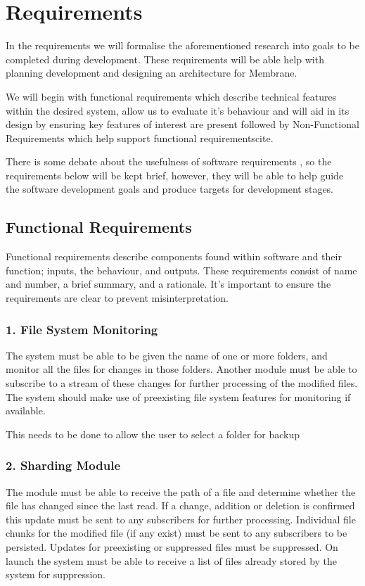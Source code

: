\documentclass[11pt, a4paper, twocolumn, twoside]{report}
\begin{document}
\section{Requirements}

In the requirements we will formalise the aforementioned research into goals to be completed during development. These requirements will be able help with planning development and designing an architecture for Membrane.

We will begin with functional requirements which describe technical features within the desired system, allow us to evaluate it's behaviour and will aid in its design by ensuring key features of interest are present  followed by Non-Functional Requirements which help support functional requirements{cite}.

There is some debate about the usefulness of software requirements , so the requirements below will be kept brief, however, they will be able to help guide the software development goals and produce targets for development stages.

\subsection{Functional Requirements}

Functional requirements describe components found within software and their function; inputs, the behaviour, and outputs. These requirements consist of name and number, a brief summary, and a rationale. It's important to ensure the requirements are clear to prevent misinterpretation.

\subsubsection{1. File System Monitoring}
The system must be able to be given the name of one or more folders, and monitor all the files for changes in those folders. Another module must be able to subscribe to a stream of these changes for further processing of the modified files. The system should make use of preexisting file system features for monitoring if available.

This needs to be done to allow the user to select a folder for backup 

\subsubsection{2. Sharding Module}
The module must be able to receive the path of a file and determine whether the file has changed since the last read. If a change, addition or deletion is confirmed this update must be sent to any subscribers for further processing. Individual file chunks for the modified file (if any exist) must be sent to any subscribers to be persisted. Updates for preexisting or suppressed files must be suppressed. On launch the system must be able to receive a list of files already stored by the system for suppression.
\end{document}
